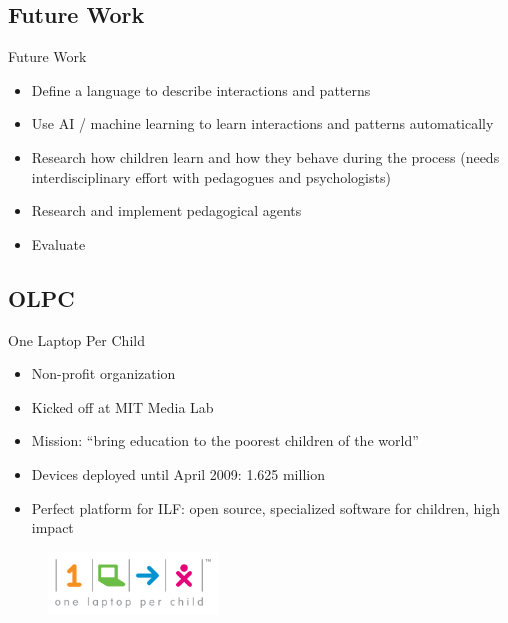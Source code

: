 \documentclass[compress]{beamer}
\begin{document}
\subsection{Future Work}

\begin{frame}{Future Work}
\pause
\begin{itemize}
\item Define a language to describe interactions and patterns
\item Use AI / machine learning to learn interactions and patterns automatically
\item Research how children learn and how they behave during the process (needs interdisciplinary effort with pedagogues and psychologists)
\item Research and implement pedagogical agents
\item Evaluate
\end{itemize}
\end{frame}

\subsection{OLPC}

\begin{frame}{One Laptop Per Child}
\begin{itemize}
\item Non-profit organization
\item Kicked off at MIT Media Lab
\item Mission: ``bring education to the poorest children of the world''
\item Devices deployed until April 2009: 1.625 million
\item Perfect platform for ILF: open source, specialized software for children, high impact 
\end{itemize}
\begin{figure}
    \centering
    \includegraphics[width=0.4\textwidth]{images/OLPC_LOGO.png}
\end{figure}
\end{frame}
\end{document}
